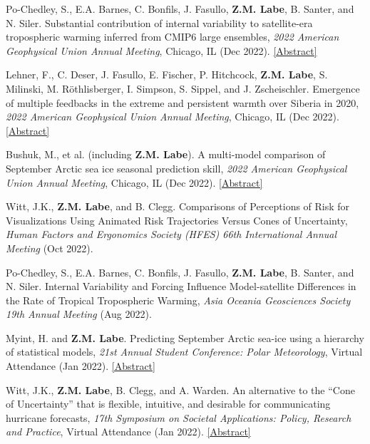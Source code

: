 \documentclass[margin,line,palatino,courier,10pt]{res}
\begin{document}
\begin{resume}
\begin{etaremune}[leftmargin=0in,topsep=0in,parsep=0in]
\item Po-Chedley, S., E.A. Barnes, C. Bonfils, J. Fasullo, \textbf{Z.M. Labe}, B. Santer, and N. Siler. Substantial contribution of internal variability to satellite-era tropospheric warming inferred from CMIP6 large ensembles, \textit{2022 American Geophysical Union Annual Meeting}, Chicago, IL (Dec 2022). \href{https://agu.confex.com/agu/fm22/meetingapp.cgi/Paper/1095614}{[Abstract]}
\item Lehner, F., C. Deser, J. Fasullo, E. Fischer, P. Hitchcock, \textbf{Z.M. Labe}, S. Milinski, M. Röthlisberger, I. Simpson, S. Sippel, and J. Zscheischler. Emergence of multiple feedbacks in the extreme and persistent warmth over Siberia in 2020, \textit{2022 American Geophysical Union Annual Meeting}, Chicago, IL (Dec 2022). \href{https://agu.confex.com/agu/fm22/meetingapp.cgi/Paper/1190729}{[Abstract]}
\item Bushuk, M., et al. (including \textbf{Z.M. Labe}). A multi-model comparison of September Arctic sea ice seasonal prediction skill, \textit{2022 American Geophysical Union Annual Meeting}, Chicago, IL (Dec 2022). \href{https://agu.confex.com/agu/fm22/meetingapp.cgi/Paper/1179488}{[Abstract]}
\item Witt, J.K., \textbf{Z.M. Labe}, and B. Clegg. Comparisons of Perceptions of Risk for Visualizations Using Animated Risk Trajectories Versus Cones of Uncertainty, \textit{Human Factors and Ergonomics Society (HFES) 66th International Annual Meeting} (Oct 2022).
\item Po-Chedley, S., E.A. Barnes, C. Bonfils, J. Fasullo, \textbf{Z.M. Labe}, B. Santer, and N. Siler. Internal Variability and Forcing Influence Model-satellite Differences in the Rate of Tropical Tropospheric Warming, \textit{Asia Oceania Geosciences Society 19th Annual Meeting} (Aug 2022).
\item Myint, H. and \textbf{Z.M. Labe}. Predicting September Arctic sea-ice using a hierarchy of statistical models, \textit{21st Annual Student Conference: Polar Meteorology}, Virtual Attendance (Jan 2022). \href{https://ams.confex.com/ams/102ANNUAL/meetingapp.cgi/Paper/391367}{[Abstract]}
\item Witt, J.K., \textbf{Z.M. Labe}, B. Clegg, and A. Warden. An alternative to the ``Cone of Uncertainty'' that is flexible, intuitive, and desirable for communicating hurricane forecasts, \textit{17th Symposium on Societal Applications: Policy, Research and Practice}, Virtual Attendance (Jan 2022). \href{https://ams.confex.com/ams/102ANNUAL/meetingapp.cgi/Paper/395666}{[Abstract]}

\end{etaremune}
\end{resume}
\end{document}
